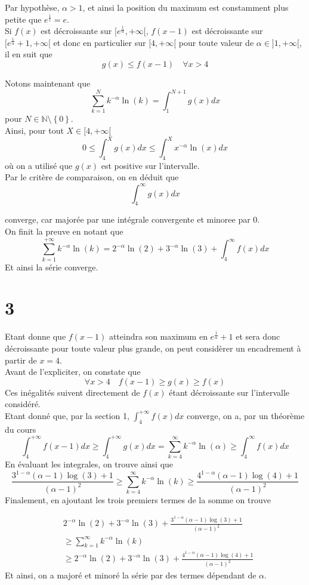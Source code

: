 \documentclass[11pt, a4paper]{article}
\begin{document}
Par hypothèse, $\alpha>1$, et ainsi la position du maximum est constamment plus petite que $e^{\frac{1}{1}}=e$.\\
Si $f( x) $ est décroissante sur $[e^{\frac{1}{\alpha}}, + \infty [ $, $f( x-1) $ est décroissante sur $[e^{\frac{1}{\alpha}}+1, + \infty [ $ et donc en particulier sur $[4, + \infty[ $ pour toute valeur de $\alpha \in ]1, + \infty[$, il en suit que
\[ 
	g( x) \leq f( x-1) \quad \forall x > 4 
\]


Notons maintenant que
\[ 
	\sum_{k=1}^{ N } k^{-\alpha}\ln( k) = \int_{ 1 }^{ N+1  } g( x) dx
\]
pour $N \in \mathbb{N}\setminus \left\{ 0 \right\} $.\\
Ainsi, pour tout $X \in [4, + \infty[$ 
\[ 
0 \leq	\int_{ 4 }^{ X }g( x) dx \leq \int_{ 4 }^{ X }x^{-\alpha}\ln( x) dx 
\]
où on a utilisé que $g( x) $ est positive sur l'intervalle.\\
Par le critère de comparaison, on en déduit que
\[ 
	\int_{ 4 }^{ \infty  } g( x) dx 
\]

converge, car majorée par une intégrale convergente et minoree par 0.\\
On finit la preuve en notant que
\[ 
	\sum_{k=1}^{ + \infty } k^{-\alpha}\ln( k) = 2^{-\alpha}\ln( 2) + 3^{-\alpha}\ln( 3) +\int_{ 4 }^{ \infty  }f( x) dx
\]
Et ainsi la série converge.
\section*{3}
Etant donne que $f( x-1) $ atteindra son maximum en $e^{\frac{1}{\alpha}}+1$ et sera donc décroissante pour toute valeur plus grande, on peut considèrer un encadrement à partir de $x=4$.\\
Avant de l'expliciter, on constate que
\[ 
	\forall x>4\quad f( x-1) \geq g( x) \geq f(x) 
\]
Ces inégalités suivent directement de $f( x)  $ étant décroissante sur l'intervalle considéré.\\

Etant donné que, par la section 1, $ \int_{ 4 }^{ + \infty  }f( x) dx$ converge, on a, par un théorème du cours
\[ 
	\int_{ 4 }^{ + \infty  } f( x-1) dx \geq \int_{ 4 }^{ + \infty  }g( x) dx = \sum_{k=4}^{ \infty } k^{-\alpha} \ln( \alpha) \geq \int_{ 4 }^{ \infty  }f( x) dx
\]
En évaluant les integrales, on trouve ainsi que
\[ 
	\frac{3^{1-\alpha}( \alpha-1) \log( 3) +1}{( \alpha-1) ^{2}} \geq\sum_{k=4}^{ \infty } k^{-\alpha} \ln( k)\geq \frac{4^{1-\alpha}( \alpha-1) \log( 4) +1}{( \alpha-1) ^{2}} 
\]
Finalement, en ajoutant les trois premiers termes de la somme on trouve

\begin{align*}
	&2^{-\alpha}\ln( 2) + 3^{-\alpha}\ln( 3)  + \frac{3^{1-\alpha}( \alpha-1) \log( 3) +1}{( \alpha-1) ^{2}}\\
	&\geq\sum_{k=1}^{ \infty } k^{-\alpha} \ln( k)\\
	&\geq 2^{-\alpha}\ln( 2)+ 3^{-\alpha}\ln( 3) +\frac{4^{1-\alpha}( \alpha-1) \log( 4) +1}{( \alpha-1) ^{2}} 
\end{align*}
Et ainsi, on a majoré et minoré la série par des termes dépendant de $\alpha$.
\end{document}
